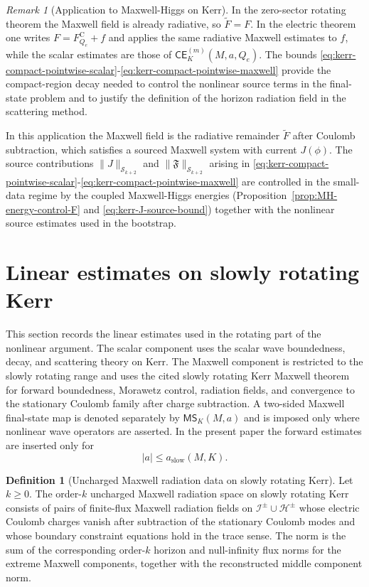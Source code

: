 \documentclass[11pt]{article}
\numberwithin{equation}{section}
\theoremstyle{plain}
\theoremstyle{definition}
\newtheorem{definition}{Definition}[section]
\theoremstyle{remark}
\newtheorem{remark}{Remark}[section]
\newcommand{\CElec}{\mathsf{CE}}
\newcommand{\MScat}{\mathsf{MS}}
\begin{document}
\begin{remark}[Application to Maxwell-Higgs on Kerr]\label{rem:kerr-near-mh}
In the zero-sector rotating theorem the Maxwell field is already radiative, so $\widetilde F=F$.  In the electric theorem one writes $F=F^{\mathrm C}_{Q_e}+f$ and applies the same radiative Maxwell estimates to $f$, while the scalar estimates are those of \(\CElec^{(m)}_K(M,a,Q_e)\).
The bounds \eqref{eq:kerr-compact-pointwise-scalar}-\eqref{eq:kerr-compact-pointwise-maxwell} provide the compact-region decay needed to control the nonlinear source terms in the final-state problem and to justify the definition of the horizon radiation field in the scattering method.

In this application the Maxwell field is the radiative remainder $\widetilde F$ after Coulomb subtraction, which satisfies a sourced Maxwell system with current $J(\phi)$.
The source contributions $\|J\|_{\mathcal S_{k+2}}$ and $\|\mathfrak{F}\|_{\mathcal S_{k+2}}$ arising in \eqref{eq:kerr-compact-pointwise-scalar}-\eqref{eq:kerr-compact-pointwise-maxwell} are controlled in the small-data regime by the coupled Maxwell-Higgs energies (Proposition~\ref{prop:MH-energy-control-F} and \eqref{eq:kerr-J-source-bound}) together with the nonlinear source estimates used in the bootstrap.
\end{remark}




\section{Linear estimates on slowly rotating Kerr}\label{sec:kerr-extension}

This section records the linear estimates used in the rotating part of the nonlinear argument.  The scalar component uses the scalar wave boundedness, decay, and scattering theory on Kerr.  The Maxwell component is restricted to the slowly rotating range and uses the cited slowly rotating Kerr Maxwell theorem for forward boundedness, Morawetz control, radiation fields, and convergence to the stationary Coulomb family after charge subtraction.  A two-sided Maxwell final-state map is denoted separately by \(\MScat_K(M,a)\) and is imposed only where nonlinear wave operators are asserted.  In the present paper the forward estimates are inserted only for
\begin{equation}
 |a|\le a_{\mathrm{slow}}(M,K).
\end{equation}

\begin{definition}[Uncharged Maxwell radiation data on slowly rotating Kerr]\label{def:maxwell-kerr-radiation-data}
Let \(k\ge0\).  The order-\(k\) uncharged Maxwell radiation space on slowly rotating Kerr consists of pairs of finite-flux Maxwell radiation fields on \(\mathcal I^{\pm}\cup\mathcal H^{\pm}\) whose electric Coulomb charges vanish after subtraction of the stationary Coulomb modes and whose boundary constraint equations hold in the trace sense.  The norm is the sum of the corresponding order-\(k\) horizon and null-infinity flux norms for the extreme Maxwell components, together with the reconstructed middle component norm.
\end{definition}
\end{document}

